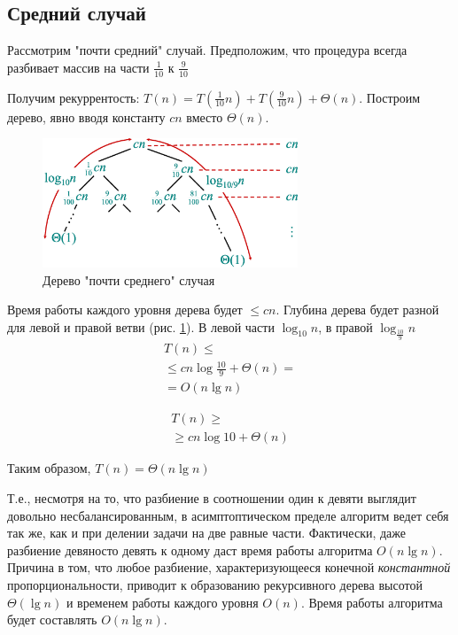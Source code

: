\documentclass[11pt]{article}
\begin{document}
\subsection{Средний случай}

Рассмотрим "почти средний" случай. Предположим, что процедура всегда разбивает массив на части $\frac{1}{10}$ к $\frac{9}{10}$

Получим рекуррентость: $T(n) = T(\frac{1}{10} n) + T(\frac{9}{10} n) + \Theta(n)$. Построим дерево, явно вводя константу $c n$ вместо $\Theta(n)$.
\begin{figure}[ht]
  \centering
  \includegraphics[width=3in]{lecture4/tree2.eps}
  \caption{Дерево "почти среднего" случая}
  \label{fig:tree2}
\end{figure}

Время работы каждого уровня дерева будет $\leqslant c n$. Глубина дерева будет разной для левой и правой ветви (рис. \ref{fig:tree2}). В левой части $\log_{10} n$, в правой $\log_{\frac{10}{9}} n$
\begin{align*}
  T(n) \leqslant \\
    \leqslant c n \log{\frac{10}{9}} + \Theta(n) = \\
    = O(n \lg n)
\end{align*}

\begin{align*}
  T(n) \geqslant \\
    \geqslant c n \log{10} + \Theta(n)
\end{align*}

Таким образом, $T(n) = \Theta(n \lg n)$

Т.е., несмотря на то, что разбиение в соотношении один к девяти выглядит довольно несбалансированным, в асимптоптическом пределе алгоритм ведет себя так же, как и при делении задачи на две равные части. Фактически, даже разбиение девяносто девять к одному даст время работы алгоритма $O(n \lg n)$. Причина в том, что любое разбиение, характеризующееся конечной \emph{константной} пропорциональности, приводит к образованию рекурсивного дерева высотой $\Theta(\lg n)$ и временем работы каждого уровня $O(n)$. Время работы алгоритма будет составлять $O(n \lg n)$.
\end{document}
